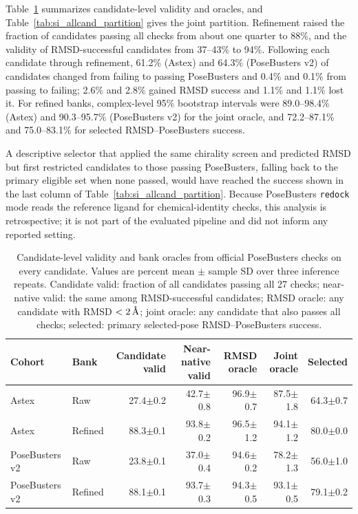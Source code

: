 \documentclass{article}
\newcommand{\angstrom}{\text{\normalfont\AA}}
\begin{document}
Table~\ref{tab:si_allcand_validity} summarizes candidate-level validity and oracles, and Table~\ref{tab:si_allcand_partition} gives the joint partition. Refinement raised the fraction of candidates passing all checks from about one quarter to 88\%, and the validity of RMSD-successful candidates from 37--43\% to 94\%. Following each candidate through refinement, 61.2\% (Astex) and 64.3\% (PoseBusters v2) of candidates changed from failing to passing PoseBusters and 0.4\% and 0.1\% from passing to failing; 2.6\% and 2.8\% gained RMSD success and 1.1\% and 1.1\% lost it. For refined banks, complex-level 95\% bootstrap intervals were 89.0--98.4\% (Astex) and 90.3--95.7\% (PoseBusters v2) for the joint oracle, and 72.2--87.1\% and 75.0--83.1\% for selected RMSD--PoseBusters success.

A descriptive selector that applied the same chirality screen and predicted RMSD but first restricted candidates to those passing PoseBusters, falling back to the primary eligible set when none passed, would have reached the success shown in the last column of Table~\ref{tab:si_allcand_partition}. Because PoseBusters \texttt{redock} mode reads the reference ligand for chemical-identity checks, this analysis is retrospective; it is not part of the evaluated pipeline and did not inform any reported setting.

\begin{table}[htbp]
\centering\footnotesize\setlength{\tabcolsep}{4pt}
\caption{Candidate-level validity and bank oracles from official PoseBusters checks on every candidate. Values are percent mean \(\pm\) sample SD over three inference repeats. Candidate valid: fraction of all candidates passing all 27 checks; near-native valid: the same among RMSD-successful candidates; RMSD oracle: any candidate with RMSD \(<2\,\angstrom\); joint oracle: any candidate that also passes all checks; selected: primary selected-pose RMSD--PoseBusters success.}
\label{tab:si_allcand_validity}
\begin{tabular}{llrrrrr}
\toprule
Cohort & Bank & Candidate valid & Near-native valid & RMSD oracle & Joint oracle & Selected \\
\midrule
Astex & Raw & 27.4\(\pm\)0.2 & 42.7\(\pm\)0.8 & 96.9\(\pm\)0.7 & 87.5\(\pm\)1.8 & 64.3\(\pm\)0.7 \\
Astex & Refined & 88.3\(\pm\)0.1 & 93.8\(\pm\)0.2 & 96.5\(\pm\)1.2 & 94.1\(\pm\)1.2 & 80.0\(\pm\)0.0 \\
PoseBusters v2 & Raw & 23.8\(\pm\)0.1 & 37.0\(\pm\)0.4 & 94.6\(\pm\)0.2 & 78.2\(\pm\)1.3 & 56.0\(\pm\)1.0 \\
PoseBusters v2 & Refined & 88.1\(\pm\)0.1 & 93.7\(\pm\)0.3 & 94.3\(\pm\)0.5 & 93.1\(\pm\)0.5 & 79.1\(\pm\)0.2 \\
\bottomrule
\end{tabular}
\end{table}
\end{document}
